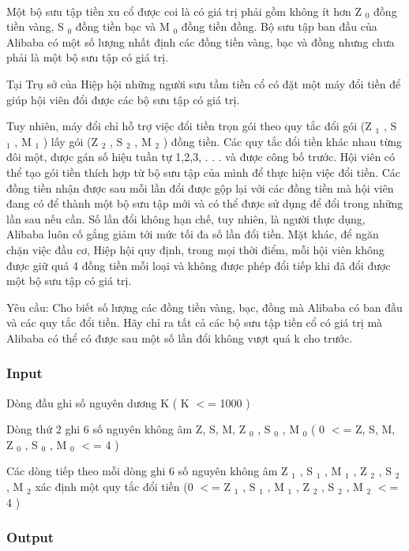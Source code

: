 

 

Một bộ sưu tập tiền xu cổ được coi là có giá trị phải gồm không ít hơn Z $_ 0 $ đồng tiền vàng, S $_ 0 $ đồng tiền bạc và M $_ 0 $ đồng tiền đồng. Bộ sưu tập ban đầu của Alibaba có một số lượng nhất định các đồng tiền vàng, bạc và đồng nhưng chưa phải là một bộ sưu tập có giá trị.

Tại Trụ sở của Hiệp hội những người sưu tầm tiền cổ có đặt một máy đổi tiền để giúp hội viên đổi được các bộ sưu tập có giá trị.

Tuy nhiên, máy đổi chỉ hỗ trợ việc đổi tiền trọn gói theo quy tắc đổi gói (Z $_ 1 $ , S $_ 1 $ , M $_ 1 $ ) lấy gói (Z $_ 2 $ , S $_ 2 $ , M $_ 2 $ ) đồng tiền. Các quy tắc đổi tiền khác nhau từng đôi một, được gán số hiệu tuần tự 1,2,3, . . . và được công bố trước. Hội viên có thể tạo gói tiền thích hợp từ bộ sưu tập của mình để thực hiện việc đổi tiền. Các đồng tiền nhận được sau mỗi lần đổi được gộp lại với các đồng tiền mà hội viên đang có để thành một bộ sưu tập mới và có thể được sử dụng để đổi trong những lần sau nếu cần. Số lần đổi không hạn chế, tuy nhiên, là người thực dụng, Alibaba luôn cố gắng giảm tới mức tối đa số lần đổi tiền. Mặt khác, để ngăn chặn việc đầu cơ, Hiệp hội quy định, trong mọi thời điểm, mỗi hội viên không được giữ quá 4 đồng tiền mỗi loại và không được phép đổi tiếp khi đã đổi được một bộ sưu tập có giá trị.

Yêu cầu: Cho biết số lượng các đồng tiền vàng, bạc, đồng mà Alibaba có ban đầu và các quy tắc đổi tiền. Hãy chỉ ra tất cả các bộ sưu tập tiền cổ có giá trị mà Alibaba có thể có được sau một số lần đổi không vượt quá k cho trước.

\subsubsection{Input}

Dòng đầu ghi số nguyên dương K ( K $<$= 1000 )

Dòng thứ 2 ghi 6 số nguyên không âm Z, S, M, Z $_ 0 $ , S $_ 0 $ , M $_ 0 $ ( 0 $<$= Z, S, M, Z $_ 0 $ , S $_ 0 $ , M $_ 0 $ $<$= 4 )

Các dòng tiếp theo mỗi dòng ghi 6 số nguyên không âm Z $_ 1 $ , S $_ 1 $ , M $_ 1 $ , Z $_ 2 $ , S $_ 2 $ , M $_ 2 $ xác định một quy tắc đổi tiền (0 $<$= Z $_ 1 $ , S $_ 1 $ , M $_ 1 $ , Z $_ 2 $ , S $_ 2 $ , M $_ 2 $ $<$= 4 )

\subsubsection{Output}

